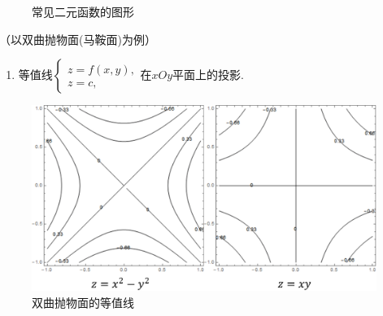 \documentclass[12pt,UTF8]{ctexart}
\begin{document}
\begin{enumerate}
\begin{figure}[H]
\caption{常见二元函数的图形}
\end{figure}
（以双曲抛物面(马鞍面)为例）
\begin{enumerate}
\item[]等值线$\begin{cases}
z=f(x,y),\\
z=c,
\end{cases}$在$xOy$平面上的投影.
\end{enumerate}
\begin{figure}[H]
\begin{center}
\includegraphics[height=0.3\textheight]{Figures20190605/Contour.png}
\end{center}
\caption{双曲抛物面的等值线}
\end{figure}
\end{enumerate}
\end{document}
